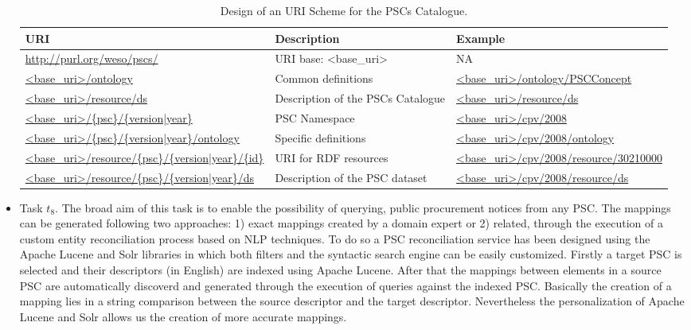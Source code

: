 \begin{itemize}
 \begin{table}[!ht]
\renewcommand{\arraystretch}{1.3}
\begin{center}
\begin{tabular}[c]{|p{5cm}|p{4.5cm}|p{5cm}|} 
\hline
  \textbf{URI} &  \textbf{Description} & \textbf{Example} \\\hline
  \url{http://purl.org/weso/pscs/} & URI base: <base\_uri> & NA \\ \hline
  \url{<base_uri>/ontology} & Common definitions & \url{<base_uri>/ontology/PSCConcept} \\ \hline
  \url{<base_uri>/resource/ds} & Description of the PSCs Catalogue & \url{<base_uri>/resource/ds} \\ \hline
  \url{<base_uri>/{psc}/{version|year}} & PSC Namespace & \url{<base_uri>/cpv/2008} \\ \hline
  \url{<base_uri>/{psc}/{version|year}/ontology} & Specific definitions & \url{<base_uri>/cpv/2008/ontology} \\ \hline
  \url{<base_uri>/resource/{psc}/{version|year}/{id}} & URI for RDF resources & \url{<base_uri>/cpv/2008/resource/30210000} \\ \hline
  \url{<base_uri>/resource/{psc}/{version|year}/ds} & Description of the PSC dataset  & \url{<base_uri>/cpv/2008/resource/ds} \\ \hline
\hline
\end{tabular}
\caption{Design of an URI Scheme for the PSCs Catalogue.}\label{table:pscs-uri}
  \end{center}
\end{table} 

\item Task $t_8$. The broad aim of this task is to enable the possibility of querying, 
public procurement notices from any PSC. The mappings can be generated following two approaches: 
1) exact mappings created by a domain expert or 2) related, through the execution of a custom entity reconciliation process 
based on NLP techniques. To do so a PSC reconciliation service has been designed using the Apache Lucene and Solr libraries in which
both filters and the syntactic search engine can be easily customized. Firstly a target PSC is selected and their descriptors (in English) 
are indexed using Apache Lucene. After that the mappings between elements in a source PSC are automatically discoverd and generated through the execution 
of queries against the indexed PSC. Basically the creation of a mapping lies in a string comparison between the source descriptor and the 
target descriptor. Nevertheless the personalization of Apache Lucene and Solr allows us the creation of more accurate mappings.


\end{itemize}
